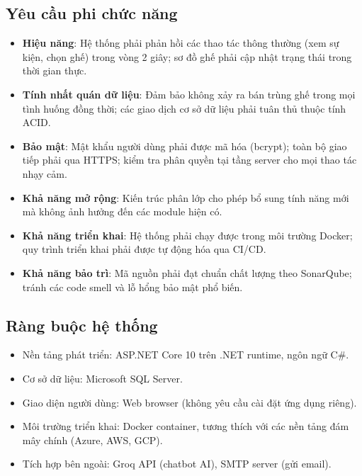 \documentclass[../main.tex]{subfiles}
\begin{document}
\subsection{Yêu cầu phi chức năng}

\begin{itemize}
    \item \textbf{Hiệu năng}: Hệ thống phải phản hồi các thao tác thông thường (xem sự kiện, chọn ghế) trong vòng 2 giây; sơ đồ ghế phải cập nhật trạng thái trong thời gian thực.
    \item \textbf{Tính nhất quán dữ liệu}: Đảm bảo không xảy ra bán trùng ghế trong mọi tình huống đồng thời; các giao dịch cơ sở dữ liệu phải tuân thủ thuộc tính ACID.
    \item \textbf{Bảo mật}: Mật khẩu người dùng phải được mã hóa (bcrypt); toàn bộ giao tiếp phải qua HTTPS; kiểm tra phân quyền tại tầng server cho mọi thao tác nhạy cảm.
    \item \textbf{Khả năng mở rộng}: Kiến trúc phân lớp cho phép bổ sung tính năng mới mà không ảnh hưởng đến các module hiện có.
    \item \textbf{Khả năng triển khai}: Hệ thống phải chạy được trong môi trường Docker; quy trình triển khai phải được tự động hóa qua CI/CD.
    \item \textbf{Khả năng bảo trì}: Mã nguồn phải đạt chuẩn chất lượng theo SonarQube; tránh các code smell và lỗ hổng bảo mật phổ biến.
\end{itemize}

\subsection{Ràng buộc hệ thống}

\begin{itemize}
    \item Nền tảng phát triển: ASP.NET Core 10 trên .NET runtime, ngôn ngữ C\#.
    \item Cơ sở dữ liệu: Microsoft SQL Server.
    \item Giao diện người dùng: Web browser (không yêu cầu cài đặt ứng dụng riêng).
    \item Môi trường triển khai: Docker container, tương thích với các nền tảng đám mây chính (Azure, AWS, GCP).
    \item Tích hợp bên ngoài: Groq API (chatbot AI), SMTP server (gửi email).
\end{itemize}

\end{document}
